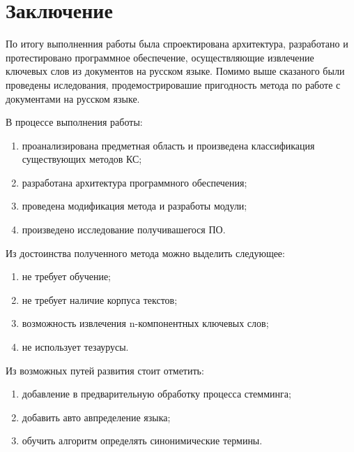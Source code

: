 \section{Заключение}
По итогу выполненния работы была спроектирована архитектура, разработано и протестировано программное обеспечение, осуществляющие извлечение ключевых слов из документов на русском языке.
Помимо выше сказаного были проведены иследования, продемострировашие пригодность метода по работе с документами на русском языке.

В процессе выполнения работы:
\begin{enumerate}
	\item проанализирована предметная область и произведена классификация существующих методов КС;
	\item разработана архитектура программного обеспечения;
	\item проведена модификация метода и разработы модули;
	\item произведено исследование получивашегося ПО.
\end{enumerate}

Из достоинства полученного метода можно выделить следующее:
\begin{enumerate}
	\item не требует обучение;
	\item не требует наличие корпуса текстов;
	\item возможность извлечения n-компонентных ключевых слов;
	\item не использует тезаурусы. 
\end{enumerate}

Из возможных путей развития стоит отметить:
\begin{enumerate}
	\item добавление в предварительную обработку процесса стемминга;
	\item добавить авто авпределение языка;
	\item обучить алгоритм определять синонимические термины.
\end{enumerate}